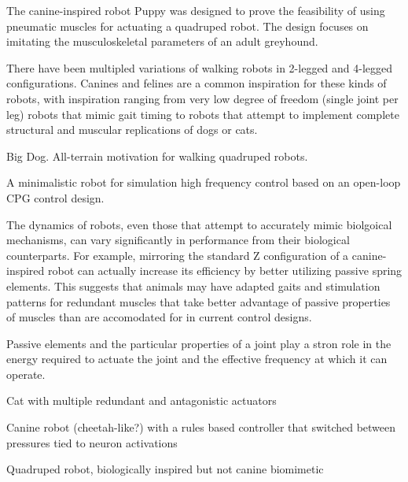 
The canine-inspired robot Puppy was designed to prove the feasibility of using
pneumatic muscles for actuating a quadruped robot. The design focuses on 
imitating the musculoskeletal parameters of an adult greyhound. 
\cite{PuppyDesign}


There have been multipled variations of walking robots in 2-legged and 4-legged
configurations. Canines and felines are a common inspiration for these kinds of
robots, with inspiration ranging from very low degree of freedom (single joint
per leg) robots that mimic gait timing to robots that attempt to implement
complete structural and muscular replications of dogs or cats.


Big Dog. All-terrain motivation for walking quadruped robots. \cite{BigDog}

A minimalistic robot for simulation high frequency control based on an open-loop
CPG control design. 
\cite{Narioka2012}


The dynamics of robots, even those that attempt to accurately mimic biolgoical
mechanisms, can vary significantly in performance from their biological
counterparts. For example, mirroring the standard Z configuration of a canine-
inspired robot can actually increase its efficiency by better utilizing passive
spring elements. This suggests that animals may have adapted gaits and
stimulation patterns for redundant muscles that take better advantage of passive
properties of muscles than are accomodated for in current control designs.
\cite{HindLegMorphology}

Passive elements and the particular properties of a joint play a stron role in
the energy required to actuate the joint and the effective frequency at which it
can operate. \cite{Na2015}



Cat with multiple redundant and antagonistic actuators
\cite{Rosendo2013}

Canine robot (cheetah-like?) with a rules based controller that switched between
pressures tied to neuron activations
\cite{Pneupard2013}

Quadruped robot, biologically inspired but not canine biomimetic \cite{Wait2014}

